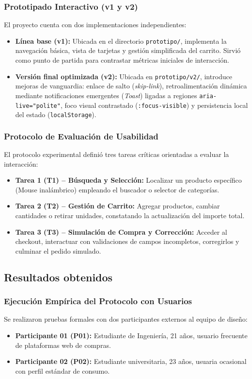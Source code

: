 \documentclass{article}
\begin{document}
\subsubsection{Prototipado Interactivo (v1 y v2)}
El proyecto cuenta con dos implementaciones independientes:
\begin{itemize}
    \item \textbf{Línea base (v1):} Ubicada en el directorio \texttt{prototipo/}, implementa la navegación básica, vista de tarjetas y gestión simplificada del carrito. Sirvió como punto de partida para contrastar métricas iniciales de interacción.
    \item \textbf{Versión final optimizada (v2):} Ubicada en \texttt{prototipo/v2/}, introduce mejoras de vanguardia: enlace de salto (\textit{skip-link}), retroalimentación dinámica mediante notificaciones emergentes (\textit{Toast}) ligadas a regiones \texttt{aria-live="polite"}, foco visual contrastado (\texttt{:focus-visible}) y persistencia local del estado (\texttt{localStorage}).
\end{itemize}

\subsubsection{Protocolo de Evaluación de Usabilidad}
El protocolo experimental definió tres tareas críticas orientadas a evaluar la interacción:
\begin{itemize}
    \item \textbf{Tarea 1 (T1) -- Búsqueda y Selección:} Localizar un producto específico (Mouse inalámbrico) empleando el buscador o selector de categorías.
    \item \textbf{Tarea 2 (T2) -- Gestión de Carrito:} Agregar productos, cambiar cantidades o retirar unidades, constatando la actualización del importe total.
    \item \textbf{Tarea 3 (T3) -- Simulación de Compra y Corrección:} Acceder al checkout, interactuar con validaciones de campos incompletos, corregirlos y culminar el pedido simulado.
\end{itemize}

\subsection{Resultados obtenidos}

\subsubsection{Ejecución Empírica del Protocolo con Usuarios}
Se realizaron pruebas formales con dos participantes externos al equipo de diseño:
\begin{itemize}
    \item \textbf{Participante 01 (P01):} Estudiante de Ingeniería, 21 años, usuario frecuente de plataformas web de compras.
    \item \textbf{Participante 02 (P02):} Estudiante universitaria, 23 años, usuaria ocasional con perfil estándar de consumo.
\end{itemize}
\end{document}
